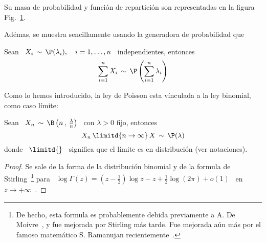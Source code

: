 
Su masa  de probabilidad  y funci\'on de  repartici\'on son representadas  en la
figura Fig.~\ref{Fig:MP:Poisson}.
%
\begin{figure}[h!]
\begin{center}  \end{center}
%
\label{Fig:MP:Poisson}
\end{figure}

Ad\'emas, se muestra  sencillamente usando la generadora de  probabilidad que
%
\begin{lema}[Stabilidad]
\label{Lem:MP:StabilidadPoisson}
%
  Sean  \  $X_i  \,  \sim  \,  \P(\lambda_i),  \quad  i  =  1,  \ldots  ,  n$  \
  independientes, entonces
  \[
  \sum_{i=1}^n X_i \, \sim \, \P\left( \sum_{i=1}^n \lambda_i \right)
  \]
\end{lema}


Como lo hemos introducido, la ley de Poisson esta v\'inculada a la ley binomial, como caso l\'imite:
%
\begin{lema}
\label{Lem:MP:VinvuloPoissonBinomial}
%
  Sean  \  $X_n  \,  \sim  \,  \B\left( n \, , \, \frac{\lambda}{n} \right)$  \
  con $\lambda > 0$ fijo, entonces
  \[
  X_n \, \limitd{n \to \infty} \, X \, \sim \, \P(\lambda)
  \]
  donde  \ $\limitd{}$ \  significa que  el l\'imite  es en  distribuci\'on (ver
  notaciones).
\end{lema}
\begin{proof}
  Se  sale  de la  forma  de  la distribuci\'on  binomial  y  de  la formula  de
  Stirling~\footnote{De hecho, esta  formula es probablemente debida previamente
    a  A.  De  Moivre~\cite{Moi33, Moi56,  Pea24,  Cam86, Dut91,  Dem33}, y  fue
    mejorada por  Stirling m\'as tarde. Fue  mejorada a\'un m\'as  por el famoso
    matem\'atico                          S.                           Ramanujan
    recientemente~\cite[\S~4.1]{AndBer13}.\label{Foot:MP:Stirling}}    para    \
  $\log\Gamma(z) = \left( z - \frac12 \right) \log z - z + \frac12 \log(2 \pi) +
  o(1)$ \ en \ $z \to +\infty$~\cite{Sti30, AbrSte70, GraRyz15}.
\end{proof}

